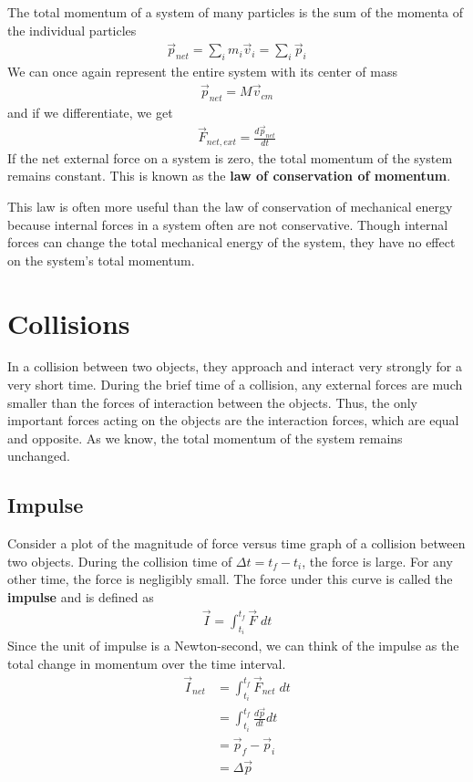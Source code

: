 \documentclass[11pt]{article}
\begin{document}
The total momentum of a system of many particles is the sum of the momenta of the individual particles
\begin{align*}
    \Vec{p}_{net} = \sum_i m_i \Vec{v}_i = \sum_i \Vec{p}_i
\end{align*}
We can once again represent the entire system with its center of mass
\begin{align*}
    \Vec{p}_{net} = M\Vec{v}_{cm}
\end{align*}
and if we differentiate, we get
\begin{align*}
    \Vec{F}_{net,ext} = \frac{d\Vec{p}_{net}}{dt}
\end{align*}
If the net external force on a system is zero, the total momentum of the system remains constant. This is known as the \textbf{law of conservation of momentum}.

This law is often more useful than the law of conservation of mechanical energy because internal forces in a system often are not conservative. Though internal forces can change the total mechanical energy of the system, they have no effect on the system's total momentum. 

\section{Collisions}

In a collision between two objects, they approach and interact very strongly for a very short time. During the brief time of a collision, any external forces are much smaller than the forces of interaction between the objects. Thus, the only important forces acting on the objects are the interaction forces, which are equal and opposite. As we know, the total momentum of the system remains unchanged. 

\subsection{Impulse}

Consider a plot of the magnitude of force versus time graph of a collision between two objects. During the collision time of $\Delta t = t_f - t_i$, the force is large. For any other time, the force is negligibly small. The force under this curve is called the \textbf{impulse} and is defined as
\begin{align*}
    \Vec{I} = \int_{t_i}^{t_f} \Vec{F}\;dt
\end{align*}
Since the unit of impulse is a Newton-second, we can think of the impulse as the total change in momentum over the time interval.
\begin{align*}
    \Vec{I}_{net} &= \int_{t_i}^{t_f} \Vec{F}_{net}\;dt \\
    &= \int_{t_i}^{t_f} \frac{d\Vec{p}}{dt}dt \\
    &= \Vec{p}_f - \Vec{p}_i \\
    &= \Delta \Vec{p}
\end{align*}
\end{document}
